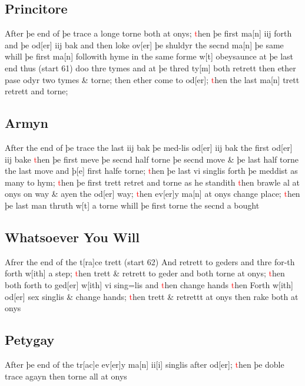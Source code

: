 \documentclass[12pt,letter]{article} %
\newcommand{\red}[1]{\textcolor{red}{#1}}
\newcommand{\srcpg}[1]{(start #1)}
\begin{document}
\subsection{Princitore}
After þe end of þe trace a longe torne both at onys; \red{t}hen þe first
ma{[}n{]} iij forth and þe od{[}er{]} iij bak and then loke ov{[}er{]}
þe shuldyr the secnd ma{[}n{]} þe same whill þe first ma{[}n{]}
followith hyme in the same forme w{[}t{]} obeysaunce at þe last end thus
\srcpg{61} doo thre tymes and at þe thred ty{[}m{]} both retrett then
ether pase odyr two tymes \& torne; then ether come to od{[}er{]}; \red{t}hen
the last ma{[}n{]} trett retrett and torne;

\subsection{Armyn}
After the end of þe trace the last iij bak þe med-lis od{[}er{]} iij bak
the first od{[}er{]} iij bake \red{t}hen þe first meve þe secnd half torne þe
secnd move \& þe last half torne the last move and þ{[}e{]} first halfe
torne; \red{t}hen þe last vi singlis forth þe meddist as many to hym; \red{t}hen þe
first trett retret and torne as he standith \red{t}hen brawle al at onys on
way \& ayen the od{[}er{]} way; \red{t}hen ev{[}er{]}y ma{[}n{]} at onys change
place; \red{t}hen þe last man thruth w{[}t{]} a torne whill þe first torne the
secnd a bought

\subsection{Whatsoever You Will}
Afrer the end of the t{[}ra{]}ce trett \srcpg{62} And retrett to geders
and thre for-th forth w{[}ith{]} a step; \red{t}hen trett \& retrett to geder
and both torne at onys; \red{t}hen both forth to ged{[}er{]} w{[}ith{]} vi
sing=lis and \red{t}hen change hands \red{t}hen Forth w{[}ith{]} od{[}er{]} sex
singlis \& change hands; \red{t}hen trett \& retrettt at onys then rake both
at onys

\subsection{Petygay}
After þe end of the tr{[}ac{]}e ev{[}er{]}y ma{[}n{]} ii{[}i{]} singlis
after od{[}er{]}; \red{t}hen þe doble trace agayn then torne all at onys
\end{document}
